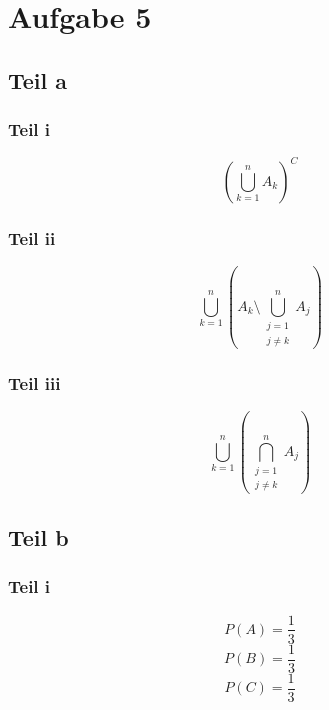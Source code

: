 \documentclass[10pt,a4paper]{article}
\begin{document}
\section{Aufgabe 5}

\subsection{Teil a}

\subsubsection{Teil i}
\begin{equation}
  \left( \bigcup_{k = 1}^{n} A_{k} \right)^{C}
\end{equation}

\subsubsection{Teil ii}
\begin{equation}
  \bigcup_{k = 1}^{n} \left( A_{k} \setminus \bigcup_{\substack{j = 1 \\ j \neq k}}^{n} A_{j} \right)
\end{equation}

\subsubsection{Teil iii}
\begin{equation}
  \bigcup_{k = 1}^{n} \left( \bigcap_{\substack{j = 1\\j \neq k}}^{n} A_{j} \right)
\end{equation}

\subsection{Teil b}

\subsubsection{Teil i}
\begin{equation}
  P(A) = \frac{1}{3}
\end{equation}
\begin{equation}
  P(B) = \frac{1}{3}
\end{equation}
\begin{equation}
  P(C) = \frac{1}{3}
\end{equation}
\end{document}
